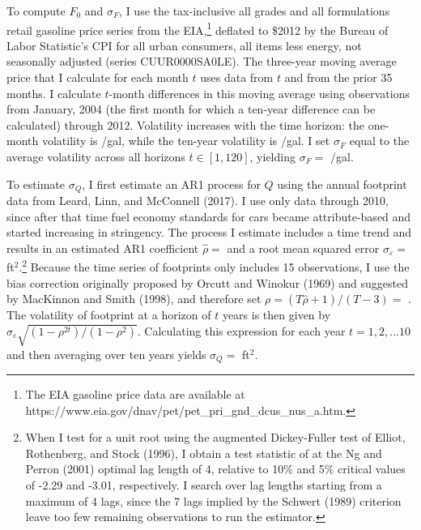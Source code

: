 \documentclass[12pt]{article}
\begin{document}
To compute $F_0$ and $\sigma_F$, I use the tax-inclusive all grades and all formulations retail gasoline price series from the EIA,\footnote{The EIA gasoline price data are available at https://www.eia.gov/dnav/pet/pet\_pri\_gnd\_dcus\_nus\_a.htm.} deflated to \$2012 by the Bureau of Labor Statistic's CPI for all urban consumers, all items less energy, not seasonally adjusted (series CUUR0000SA0LE). The three-year moving average price that I calculate for each month $t$ uses data from $t$ and from the prior 35 months. I calculate $t$-month differences in this moving average using observations from January, 2004 (the first month for which a ten-year difference can be calculated) through 2012. Volatility increases with the time horizon: the one-month volatility is \unskip /gal, while the ten-year volatility is \unskip /gal. I set $\sigma_F$ equal to the average volatility across all horizons $t\in[1,120]$, yielding $\sigma_F=$ \unskip /gal.

To estimate $\sigma_Q$, I first estimate an AR1 process for $Q$ using the annual footprint data from Leard, Linn, and McConnell (2017). I use only data through 2010, since after that time fuel economy standards for cars became attribute-based and started increasing in stringency. The process I estimate includes a time trend and results in an estimated AR1 coefficient $\hat{\rho}=$ and a root mean squared error $\sigma_\varepsilon=$ ft$^2$.\footnote{When I test for a unit root using the augmented Dickey-Fuller test of Elliot, Rothenberg, and Stock (1996), I obtain a test statistic of at the Ng and Perron (2001) optimal lag length of 4, relative to 10\% and 5\% critical values of -2.29 and -3.01, respectively. I search over lag lengths starting from a maximum of 4 lags, since the 7 lags implied by the Schwert (1989) criterion leave too few remaining observations to run the estimator.} Because the time series of footprints only includes 15 observations, I use the bias correction originally proposed by Orcutt and Winokur (1969) and suggested by MacKinnon and Smith (1998), and therefore set $\rho = (T\hat{\rho}+1)/(T-3)=$ \unskip. The volatility of footprint at a horizon of $t$ years is then given by $\sigma_\varepsilon\sqrt{(1-\rho^{2t})/(1-\rho^2)}$. Calculating this expression for each year $t=1,2,...10$ and then averaging over ten years yields $\sigma_Q=$ ft$^2$.
\end{document}
